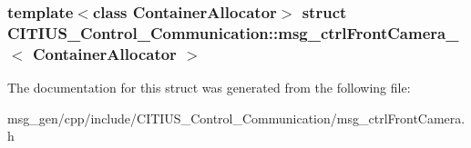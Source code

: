 \subsubsection*{template$<$class Container\-Allocator$>$ struct C\-I\-T\-I\-U\-S\-\_\-\-Control\-\_\-\-Communication\-::msg\-\_\-ctrl\-Front\-Camera\-\_\-$<$ Container\-Allocator $>$}



\-The documentation for this struct was generated from the following file\-:\begin{DoxyCompactItemize}
\item 
msg\-\_\-gen/cpp/include/\-C\-I\-T\-I\-U\-S\-\_\-\-Control\-\_\-\-Communication/msg\-\_\-ctrl\-Front\-Camera.\-h\end{DoxyCompactItemize}
